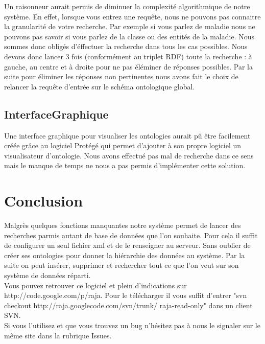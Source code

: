 \documentclass[12pt]{article}
\begin{document}
	Un raisonneur aurait permis de diminuer la complexité algorithmique de notre système. En effet, lorsque vous entrez une requête, nous ne pouvons pas connaitre la granularité de votre recherche. Par exemple si vous parlez de maladie nous ne pouvons pas savoir si vous parlez de la classe ou des entités de la maladie. Nous sommes donc obligés d'éffectuer la recherche dans tous les cas possibles. Nous devons donc lancer 3 fois (conformément au triplet RDF) toute la recherche : à gauche, au centre et à droite pour ne pas éléminer de réponses possibles. Par la suite pour éliminer les réponses non pertinentes nous avons fait le choix de relancer la requête d'entrée sur le schéma ontologique global.

\subsection{InterfaceGraphique}

	Une interface graphique pour visualiser les ontologies aurait pû être facilement créée grâce au logiciel Protégé qui permet d'ajouter à son propre logiciel un visualisateur d'ontologie. Nous avons effectué pas mal de recherche dans ce sens mais le manque de temps ne nous a pas permis d'implémenter cette solution.

\section{Conclusion}

	Malgrès quelques fonctions manquantes notre système permet de lancer des recherches parmis autant de base de données que l'on souhaite. Pour cela il suffit de configurer un seul fichier xml et de le renseigner au serveur. Sans oublier de créer ses ontologies pour donner la hiérarchie des données au système. Par la suite on peut insérer, supprimer et rechercher tout ce que l'on veut sur son système de données réparti.\\
	\indent Vous pouvez retrouver ce logiciel et plein d'indications sur http://code.google.com/p/raja. Pour le télécharger il vous suffit d'entrer "svn checkout http://raja.googlecode.com/svn/trunk/ raja-read-only" dans un client SVN.\\
	\indent Si vous l'utilisez et que vous trouvez un bug n'hésitez pas à nous le signaler sur le même site dans la rubrique Issues.
\end{document}
